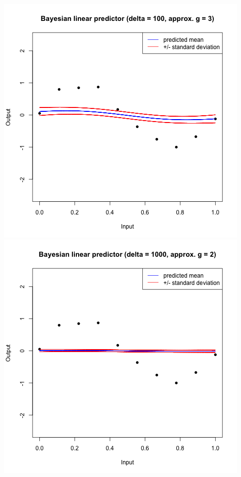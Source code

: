\documentclass[a4paper, 11pt]{article}
\begin{document}
\begin{center}
\includegraphics[scale=0.6]{ps3F_plot11.png}
\includegraphics[scale=0.6]{ps3F_plot12.png}

\end{center}
\end{document}

